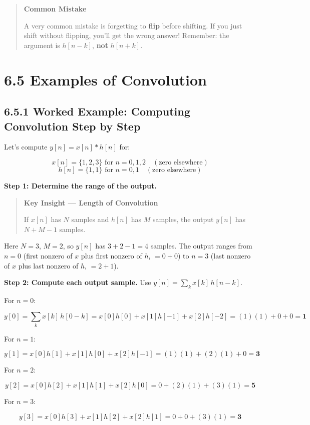 \documentclass[11pt]{article}
\begin{document}
\begin{quote}
\textbf{Common Mistake}

A very common mistake is forgetting to \textbf{flip} before shifting. If you just shift without flipping, you'll get the wrong answer! Remember: the argument is $h[n-k]$, \textbf{not} $h[n+k]$.
\end{quote}

\section*{6.5 Examples of Convolution}

\subsection*{6.5.1 Worked Example: Computing Convolution Step by Step}

Let's compute $y[n] = x[n]*h[n]$ for:

\[x[n] = \{1,2,3\}\text{ for }n=0,1,2\quad(\text{zero elsewhere})\]
\[h[n] = \{1,1\}\text{ for }n=0,1\quad(\text{zero elsewhere})\]

\textbf{Step 1: Determine the range of the output.}

\begin{quote}
\textbf{Key Insight — Length of Convolution}

If $x[n]$ has $N$ samples and $h[n]$ has $M$ samples, the output $y[n]$ has $N + M - 1$ samples.
\end{quote}

Here $N=3$, $M=2$, so $y[n]$ has $3+2-1 = 4$ samples. The output ranges from $n=0$ (first nonzero of $x$ plus first nonzero of $h$, $= 0+0$) to $n=3$ (last nonzero of $x$ plus last nonzero of $h$, $= 2+1$).

\textbf{Step 2: Compute each output sample.} Use $y[n] = \sum_k x[k]\,h[n-k]$.

For $n=0$:

\[y[0] = \sum_k x[k]\,h[0-k] = x[0]h[0] + x[1]h[-1] + x[2]h[-2] = (1)(1) + 0 + 0 = \mathbf{1}\]

For $n=1$:

\[y[1] = x[0]h[1] + x[1]h[0] + x[2]h[-1] = (1)(1) + (2)(1) + 0 = \mathbf{3}\]

For $n=2$:

\[y[2] = x[0]h[2] + x[1]h[1] + x[2]h[0] = 0 + (2)(1) + (3)(1) = \mathbf{5}\]

For $n=3$:

\[y[3] = x[0]h[3] + x[1]h[2] + x[2]h[1] = 0 + 0 + (3)(1) = \mathbf{3}\]
\end{document}
